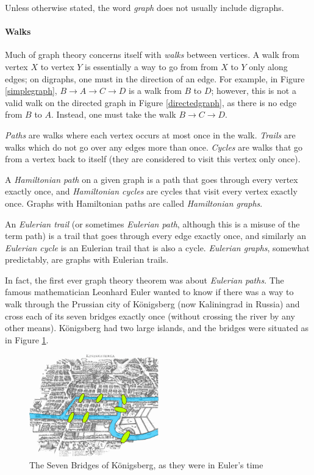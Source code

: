 \documentclass{article}
\begin{document}
	Unless otherwise stated, the word \textit{graph} does not usually include digraphs.
	
	\paragraph{Walks}
	
	Much of graph theory concerns itself with \textit{walks} between vertices. A walk from vertex \(X\) to vertex \(Y\) is essentially a way to go from from \(X\) to \(Y\)  only along edges; on digraphs, one must  in the direction of an edge. For example, in Figure \ref{simplegraph}, \(B \rightarrow A \rightarrow C \rightarrow D\) is a walk from \(B\) to \(D\); however, this is not a valid walk on the directed graph in Figure \ref{directedgraph}, as there is no edge from \(B\) to \(A\). Instead, one must take the walk \(B \rightarrow C \rightarrow D\).
	
	\textit{Paths} are walks where each vertex occurs at most once in the walk. \textit{Trails} are walks which do not go over any edges more than once. \textit{Cycles} are walks that go from a vertex back to itself (they are considered to visit this vertex only once).
	
	A \textit{Hamiltonian path} on a given graph is a path that goes through every vertex exactly once, and \textit{Hamiltonian cycles} are cycles that visit every vertex exactly once. Graphs with Hamiltonian paths are called \textit{Hamiltonian graphs}.
	
	An \textit{Eulerian trail} (or sometimes \textit{Eulerian path}, although this is a misuse of the term path) is a trail that goes through every edge exactly once, and similarly an \textit{Eulerian cycle} is an Eulerian trail that is also a cycle. \textit{Eulerian graphs}, somewhat predictably, are graphs with Eulerian trails.
	
	In fact, the first ever graph theory theorem was about \textit{Eulerian paths}. The famous mathematician Leonhard Euler wanted to know if there was a way to walk through the Prussian city of K\"onigsberg (now Kaliningrad in Russia) and cross each of its seven bridges exactly once (without crossing the river by any other means). K\"onigsberg had two large islands, and the bridges were situated as in Figure \ref{Konigsberg}.
	
	\begin{figure}[h]
		\centering
		\includegraphics[width=0.5\textwidth]{Konigsberg}
		\caption{The Seven Bridges of K\"onigsberg, as they were in Euler's time}
		\label{Konigsberg}
	\end{figure}
	
\end{document}
